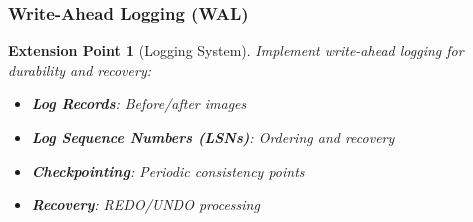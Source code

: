 \documentclass[12pt,a4paper]{article}
\newtheorem{extension}{Extension Point}[section]
\begin{document}
    \subsubsection{Write-Ahead Logging (WAL)}

    \begin{extension}[Logging System]
        Implement write-ahead logging for durability and recovery:

        \begin{itemize}
            \item \textbf{Log Records}: Before/after images
            \item \textbf{Log Sequence Numbers (LSNs)}: Ordering and recovery
            \item \textbf{Checkpointing}: Periodic consistency points
            \item \textbf{Recovery}: REDO/UNDO processing
        \end{itemize}
    \end{extension}
\end{document}
